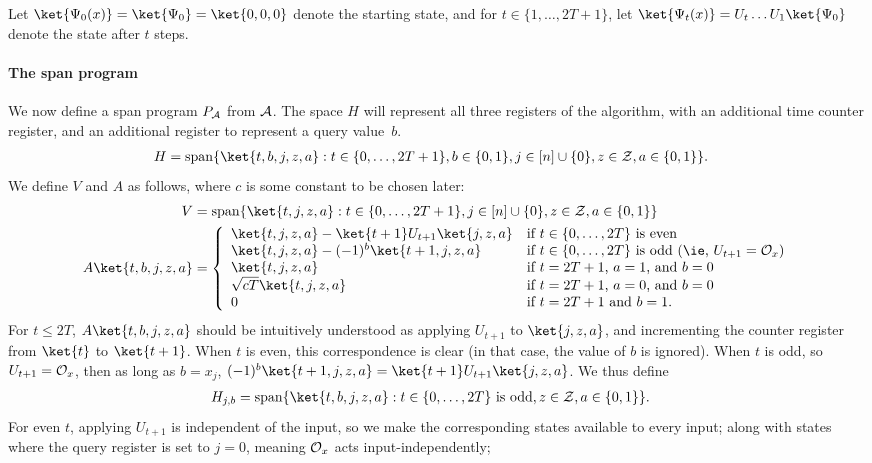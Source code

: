 \documentclass{toc}
\begin{document}
Let $\ket{\Psi_0(x)}=\ket{\Psi_0}=\ket{0,0,0}$ denote the starting state, and for $t\in\{1,\dots, 2T+1\}$, let $\ket{\Psi_t(x)}=U_t\dots U_1\ket{\Psi_0}$ denote the state after $t$ steps. 

\paragraph{The span program} We now define a span program $P_{\cal A}$ from ${\cal A}$. The space $H$ will represent all three registers of the algorithm, with an additional time counter register, and an additional register to represent a query value~$b$. 
\begin{align*}
H &= \mathrm{span}\{\ket{t,b,j,z,a}:t\in\{0,\dots,2T+1\}, b\in\{0,1\}, j\in [n]\cup\{0\}, z\in{\cal Z}, a\in\{0,1\}\}.
\end{align*}
We define $V$ and $A$ as follows, where $c$ is some constant to be chosen later:
\begin{align*}
V &= \mathrm{span}\{\ket{t,j,z,a}:t\in\{0,\dots,2T+1\}, j\in[n]\cup\{0\}, z\in{\cal Z}, a\in\{0,1\}\}\\
A\ket{t,b,j,z,a} &= \left\{\begin{array}{ll}
\ket{t,j,z,a}-\ket{t+1}U_{t+1}\ket{j,z,a} & \mbox{if $t\in\{0,\dots,2T\}$ is even}\\
\ket{t,j,z,a}-(-1)^b\ket{t+1,j,z,a} & \mbox{if $t\in\{0,\dots,2T\}$ is odd (\ie, $U_{t+1}={\cal O}_x$)}\\
\ket{t,j,z,a} & \mbox{if $t=2T+1$, $a=1$, and $b=0$}\\
\sqrt{cT}\ket{t,j,z,a} & \mbox{if $t=2T+1$, $a=0$, and $b=0$}\\
0 & \mbox{if $t=2T+1$ and $b=1$.}
\end{array}\right.
\end{align*}
For $t\leq 2T$, $A\ket{t,b,j,z,a}$ should be intuitively understood as applying $U_{t+1}$ to $\ket{j,z,a}$, and incrementing the counter register from $\ket{t}$ to $\ket{t+1}$. When $t$ is even, this correspondence is clear (in that case, the value of $b$ is ignored). When $t$ is odd, so  $U_{t+1}={\cal O}_x$, then as long as $b=x_j$, $(-1)^b\ket{t+1,j,z,a}=\ket{t+1}U_{t+1}\ket{j,z,a}$. We thus define
\begin{align*}
H_{j,b} &= \mathrm{span}\{\ket{t,b,j,z,a}:t\in\{0,\dots,2T\}\mbox{ is odd}, z\in{\cal Z}, a\in\{0,1\}\}.
\end{align*}
For even $t$, applying $U_{t+1}$ is independent of the input, so we make the corresponding states available to every input; along with states where the query register is set to $j=0$, meaning ${\cal O}_x$ acts input-independently;
\end{document}
